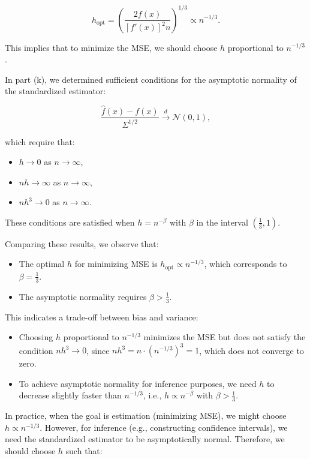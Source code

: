 \documentclass{article}
\begin{document}
\[
h_{\text{opt}} = \left( \frac{2 f(x)}{[f'(x)]^2 n} \right)^{1/3} \propto n^{-1/3}.
\]

This implies that to minimize the MSE, we should choose \( h \) proportional to \( n^{-1/3} \).

In part (k), we determined sufficient conditions for the asymptotic normality of the standardized estimator:

\[
\frac{\hat{f}(x) - f(x)}{\Sigma^{1/2}} \xrightarrow{d} \mathcal{N}(0, 1),
\]

which require that:

\begin{itemize}
    \item \( h \to 0 \) as \( n \to \infty \),
    \item \( n h \to \infty \) as \( n \to \infty \),
    \item \( n h^3 \to 0 \) as \( n \to \infty \).
\end{itemize}

These conditions are satisfied when \( h = n^{-\beta} \) with \( \beta \) in the interval \( \left( \frac{1}{3}, 1 \right) \).

Comparing these results, we observe that:

\begin{itemize}
    \item The optimal \( h \) for minimizing MSE is \( h_{\text{opt}} \propto n^{-1/3} \), which corresponds to \( \beta = \frac{1}{3} \).
    \item The asymptotic normality requires \( \beta > \frac{1}{3} \).
\end{itemize}

This indicates a trade-off between bias and variance:

\begin{itemize}
    \item Choosing \( h \) proportional to \( n^{-1/3} \) minimizes the MSE but does not satisfy the condition \( n h^3 \to 0 \), since \( n h^3 = n \cdot (n^{-1/3})^3 = 1 \), which does not converge to zero.
    \item To achieve asymptotic normality for inference purposes, we need \( h \) to decrease slightly faster than \( n^{-1/3} \), i.e., \( h \propto n^{-\beta} \) with \( \beta > \frac{1}{3} \).
\end{itemize}

In practice, when the goal is estimation (minimizing MSE), we might choose \( h \propto n^{-1/3} \). However, for inference (e.g., constructing confidence intervals), we need the standardized estimator to be asymptotically normal. Therefore, we should choose \( h \) such that:
\end{document}
